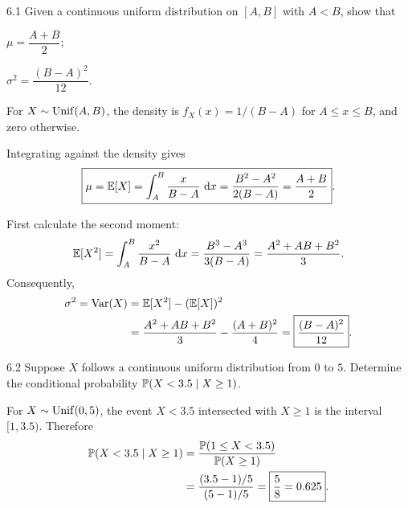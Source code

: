 \documentclass[11pt,oneside]{article}
\begin{document}
\begin{exercise}{6.1}
Given a continuous uniform distribution on $[A,B]$ with $A<B$, show that
\begin{exercisesubparts}
\item $\mu=\dfrac{A+B}{2}$;
\item $\sigma^2=\dfrac{(B-A)^2}{12}$.
\end{exercisesubparts}
\end{exercise}
\begin{solution}
For $X\sim\operatorname{Unif}(A,B)$, the density is $f_X(x)=1/(B-A)$ for $A\le x\le B$, and zero otherwise.
\begin{exercisesubparts}
\item Integrating against the density gives
\[
\boxed{\mu=\mathbb{E}[X]=\int_A^B\frac{x}{B-A}\,\mathop{}\!\mathrm{d} x
=\frac{B^2-A^2}{2(B-A)}=\frac{A+B}{2}}.
\]
\item First calculate the second moment:
\[
\mathbb{E}[X^2]=\int_A^B\frac{x^2}{B-A}\,\mathop{}\!\mathrm{d} x
=\frac{B^3-A^3}{3(B-A)}=\frac{A^2+AB+B^2}{3}.
\]
Consequently,
\[
\begin{aligned}
\sigma^2=\operatorname{Var}(X)
 &=\mathbb{E}[X^2]-(\mathbb{E}[X])^2\\
 &=\frac{A^2+AB+B^2}{3}-\frac{(A+B)^2}{4}
 =\boxed{\frac{(B-A)^2}{12}}.
\end{aligned}
\]
\end{exercisesubparts}
\end{solution}

\begin{exercise}{6.2}
Suppose $X$ follows a continuous uniform distribution from $0$ to $5$. Determine the conditional probability $\mathbb{P}(X<3.5\mid X\ge1)$.
\end{exercise}
\begin{solution}
For $X\sim\operatorname{Unif}(0,5)$, the event $X<3.5$ intersected with $X\ge1$ is the interval $[1,3.5)$. Therefore
\[
\begin{aligned}
\mathbb{P}(X<3.5\mid X\ge1)
 &=\frac{\mathbb{P}(1\le X<3.5)}{\mathbb{P}(X\ge1)}\\
 &=\frac{(3.5-1)/5}{(5-1)/5}
 =\boxed{\frac58=0.625}.
\end{aligned}
\]
\end{solution}
\end{document}
